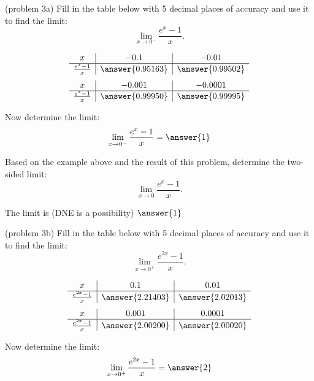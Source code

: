 \documentclass[handout]{ximera}
\begin{document}
\begin{problem}(problem 3a)
Fill in the table below with 5 decimal places of accuracy and use it to find the limit:
\[\lim_{x \to 0^-} \frac{e^x - 1}{x}.\]

\begin{center}
\[
\begin{array}{ c | c | c }
  x & -0.1 & -0.01   \\ 
	\hline 
	 \frac{e^x - 1}{x} & \answer{0.95163} & \answer{0.99502} 
\end{array}
\]
\[
\begin{array}{ c | c | c  }
  x  & -0.001 & -0.0001 \\ 
	\hline 
	 \frac{e^x - 1}{x}  & \answer{0.99950} & \answer{0.99995}
\end{array}
\]
\end{center}
Now determine the limit:
\[
\lim_{x \to 0^-} \frac{e^x - 1}{x} = \answer{1}
\]

Based on the example above and the result of this problem, determine the two-sided limit:
\[
\lim_{x \to 0} \frac{e^x - 1}{x}.
\]

The limit is (DNE is a possibility) $\answer{1}$

\end{problem}


\begin{problem}(problem 3b)
Fill in the table below with 5 decimal places of accuracy and use it to find the limit:
\[\lim_{x \to 0^+} \frac{e^{2x} - 1}{x}.\]

\begin{center}
\[
\begin{array}{ c | c | c }
  x & 0.1 & 0.01   \\ 
	\hline 
	 \frac{e^{2x} - 1}{x} & \answer{2.21403} & \answer{2.02013} 
\end{array}
\]
\[
\begin{array}{ c | c | c  }
  x  & 0.001 & 0.0001 \\ 
	\hline 
	 \frac{e^{2x} - 1}{x}  & \answer{2.00200} & \answer{2.00020}
\end{array}
\]
\end{center}
Now determine the limit:
\[
\lim_{x \to 0^+} \frac{e^{2x} - 1}{x} = \answer{2}
\]
\end{problem}
\end{document}
